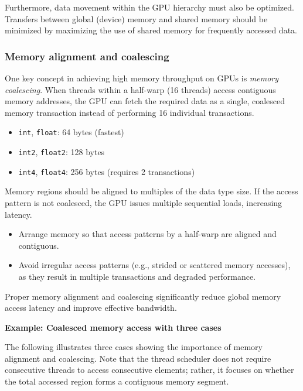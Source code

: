\documentclass[12pt]{book}
\begin{document}
    Furthermore, data movement within the GPU hierarchy must also be optimized. Transfers between global (device) memory and shared memory should be minimized by maximizing the use of shared memory for frequently accessed data.

    \subsubsection{Memory alignment and coalescing} 
One key concept in achieving high memory throughput on GPUs is \textit{memory coalescing}. When threads within a half-warp (16 threads) access contiguous memory addresses, the GPU can fetch the required data as a single, coalesced memory transaction instead of performing 16 individual transactions.

\begin{itemize}
    \item \texttt{int}, \texttt{float}: 64 bytes (fastest)
    \item \texttt{int2}, \texttt{float2}: 128 bytes
    \item \texttt{int4}, \texttt{float4}: 256 bytes (requires 2 transactions)
\end{itemize}

Memory regions should be aligned to multiples of the data type size. If the access pattern is not coalesced, the GPU issues multiple sequential loads, increasing latency.

\begin{itemize}
    \item Arrange memory so that access patterns by a half-warp are aligned and contiguous.
    \item Avoid irregular access patterns (e.g., strided or scattered memory accesses), as they result in multiple transactions and degraded performance.
\end{itemize}

Proper memory alignment and coalescing significantly reduce global memory access latency and improve effective bandwidth.

\medskip
\textbf{Example: Coalesced memory access with three cases}

The following illustrates three cases showing the importance of memory alignment and coalescing. Note that the thread scheduler does not require consecutive threads to access consecutive elements; rather, it focuses on whether the total accessed region forms a contiguous memory segment.
\end{document}
